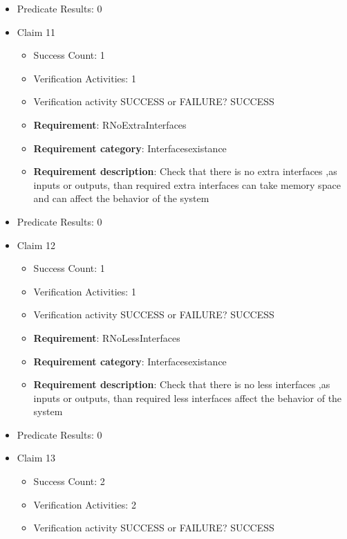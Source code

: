 \documentclass{article}
\begin{document}
\begin{itemize}
\begin{itemize}
				\end{itemize}
				
									    
				\item Predicate Results: 0

  				  \item Claim 11
				\begin{itemize}
			    	\item Success Count: 1 
			    	\item Verification Activities: 1
					\item Verification activity SUCCESS or FAILURE? SUCCESS
		
						\item \textbf{Requirement}: RNoExtraInterfaces 
						\item \textbf{Requirement category}: Interfacesexistance 
						\item \textbf{Requirement description}: Check that there is no extra interfaces ,as inputs or outputs, than required  extra interfaces can take memory space and can affect the behavior of the system
					
				\end{itemize}
				
									    
				\item Predicate Results: 0

  				  \item Claim 12
				\begin{itemize}
			    	\item Success Count: 1 
			    	\item Verification Activities: 1
					\item Verification activity SUCCESS or FAILURE? SUCCESS
		
						\item \textbf{Requirement}: RNoLessInterfaces 
						\item \textbf{Requirement category}: Interfacesexistance 
						\item \textbf{Requirement description}: Check that there is no less interfaces ,as inputs or outputs, than required  less interfaces affect the behavior of the system
					
				\end{itemize}
				
									    
				\item Predicate Results: 0

  				  \item Claim 13
				\begin{itemize}
			    	\item Success Count: 2 
			    	\item Verification Activities: 2
					\item Verification activity SUCCESS or FAILURE? SUCCESS
		

\end{itemize}
\end{itemize}
\end{document}
